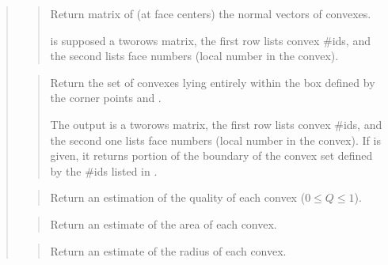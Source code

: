 \documentclass[a4paper,11pt,english]{sphinxmanual}
\begin{document}
\begin{quote}
\begin{quote}

Return matrix of (at face centers) the normal vectors of convexes.

 is supposed a two\sphinxhyphen{}rows matrix, the first row lists convex
\#ids, and the second lists face numbers (local number in the convex).
\end{quote}

\begin{quote}

Return the set of convexes lying entirely within the box defined by the corner points  and .

The output  is a two\sphinxhyphen{}rows matrix, the first row lists convex
\#ids, and the second one lists face numbers (local number in the
convex). If  is given, it returns portion of the boundary of
the convex set defined by the \#ids listed in .
\end{quote}

\begin{quote}

Return an estimation of the quality of each convex (\(0 \leq Q \leq 1\)).
\end{quote}

\begin{quote}

Return an estimate of the area of each convex.
\end{quote}

\begin{quote}

Return an estimate of the radius of each convex.
\end{quote}

\begin{quote}


\end{quote}
\end{quote}
\end{document}
